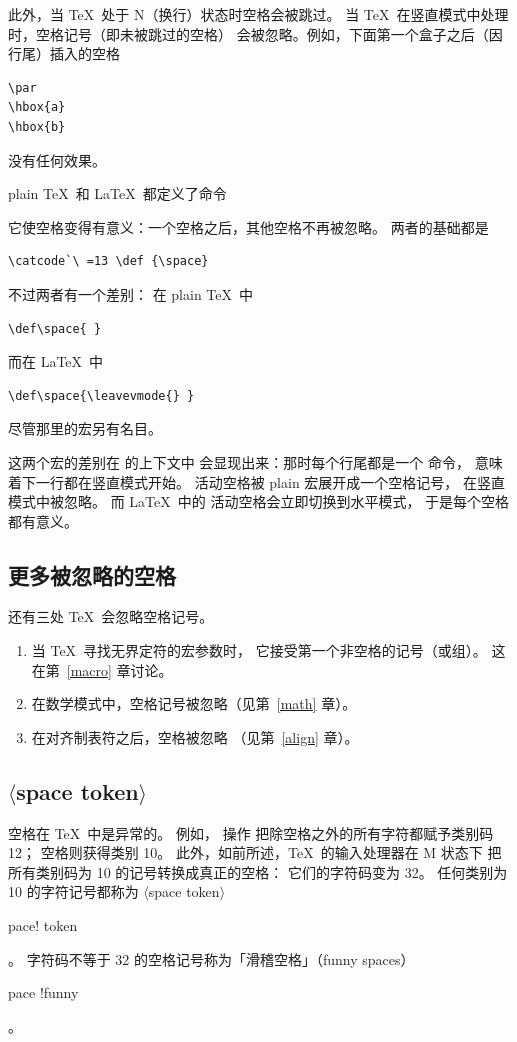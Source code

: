 \documentclass[a4paper]{rapport3}
\def\gr#1{$\langle$#1$\rangle$}\def\key#1{{\tt#1}}
\def\alt{}\def\altt{}%
\def\gram#1{\gr{#1}}%
\def\term#1\par{\index{#1}}
\begin{document}
此外，当 \TeX\ 处于 {\italic N}（换行）状态时空格会被跳过。
当 \TeX\ 在竖直模式中处理时，空格记号（即未被跳过的空格）
会被忽略。例如，下面第一个盒子之后（因行尾）插入的空格
\begin{verbatim}
\par
\hbox{a}
\hbox{b}
\end{verbatim}
没有任何效果。

plain \TeX\ 和 \LaTeX\ 都定义了命令 
\altt
它使空格变得有意义：一个空格之后，其他空格不再被忽略。
两者的基础都是
\altt
\begin{verbatim}
\catcode`\ =13 \def {\space}
\end{verbatim}
不过两者有一个差别：
在 plain \TeX\ 中 \begin{verbatim}
\def\space{ }
\end{verbatim}
而在 \LaTeX\ 中 \begin{verbatim}
\def\space{\leavevmode{} }
\end{verbatim}
尽管那里的宏另有名目。

这两个宏的差别在  的上下文中
会显现出来：那时每个行尾都是一个  命令，
意味着下一行都在竖直模式开始。
活动空格被 plain 宏展开成一个空格记号，
在竖直模式中被忽略。
而 \LaTeX\ 中的 活动空格会立即切换到水平模式，
于是每个空格都有意义。

\subsection{更多被忽略的空格}

还有三处 \TeX\ 会忽略空格记号。
\alt
\begin{enumerate}
\item 当 \TeX\ 寻找无界定符的宏参数时，
它接受第一个非空格的记号（或组）。
这在第~\ref{macro} 章讨论。

\item 在数学模式中，空格记号被忽略（见第~\ref{math} 章）。

\item 在对齐制表符之后，空格被忽略
（见第~\ref{align} 章）。
\end{enumerate}
\awp

\subsection{\gr{space token}}

空格在 \TeX\ 中是异常的。
例如， 操作
把除空格之外的所有字符都赋予类别码 12；
空格则获得类别 10。
此外，如前所述，\TeX\ 的输入处理器在 {\italic M} 状态下
把所有类别码为 10 的记号转换成真正的空格：
它们的字符码变为 32。
任何类别为 10 的字符记号都称为
\gram{space token}\term space! token\par。
字符码不等于 32 的空格记号称为「滑稽空格」（funny spaces）
\term space !funny\par。
\end{document}
